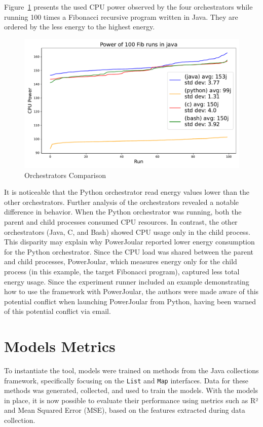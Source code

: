 Figure~\ref{fig:4_orchs_comparison} presents the used CPU power observed by the four orchestrators while running 
100 times a Fibonacci recursive program written in Java. They are ordered by the less energy to the highest energy. 

\begin{figure}[htbp]
  \centering
  \includegraphics[width = .8 \textwidth]{figures/4_orchs_comparison.pdf}
  \caption{Orchestrators Comparison}
  \label{fig:4_orchs_comparison}
\end{figure}

It is noticeable that the Python orchestrator read energy values lower than the other orchestrators. Further analysis of the orchestrators revealed a notable difference in behavior. When the Python orchestrator was running, both the parent and child processes consumed CPU resources. In contrast, the other orchestrators (Java, C, and Bash) showed CPU usage only in the child process. This disparity may explain why PowerJoular reported lower energy consumption for the Python orchestrator. Since the CPU load was shared between the parent and child processes, PowerJoular, which measures energy only for the child process (in this example, the target Fibonacci program), captured less total energy usage.
Since the experiment runner included an example demonstrating how to use the framework with PowerJoular, the authors were made aware of this potential conflict when launching PowerJoular from Python, having been warned of this potential conflict via email.


\section{Models Metrics} \label{sec:models_metrics}

To instantiate the tool, models were trained on methods from the Java collections framework, specifically focusing on the \texttt{List} and \texttt{Map} interfaces. Data for these methods was generated, collected, and used to train the models. With the models in place, it is now possible to evaluate their performance using metrics such as R² and Mean Squared Error (MSE), based on the features extracted during data collection.

